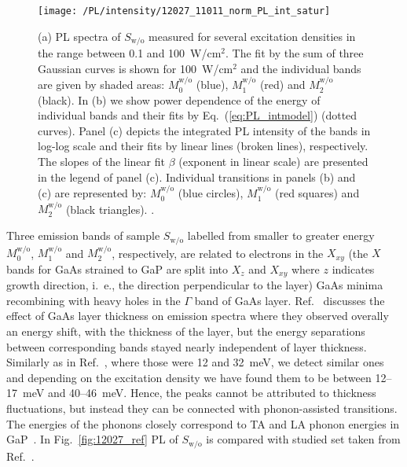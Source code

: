 \begin{figure}
	\centering
	\texttt{[image: /PL/intensity/12027\_11011\_norm\_PL\_int\_satur]}
	\caption{(a) PL spectra of $S_\mathrm{w/o}$ measured for several excitation densities in the range between 0.1 and 100~W/cm$^2$. The fit by the sum of three Gaussian curves is shown for 100~W/cm$^2$ and the individual bands are given by shaded areas: $M_0^\mathrm{w/o}$ (blue), $M_1^\mathrm{w/o}$ (red) and $M_2^\mathrm{w/o}$ (black). In (b) we show power dependence of the energy of individual bands and their fits by Eq.~(\ref{eq:PL_intmodel}) (dotted curves). Panel (c) depicts the integrated PL intensity of the bands in log-log scale and their fits by linear lines (broken lines), respectively. The slopes of the linear fit $\beta$ (exponent in linear scale) are presented in the legend of panel (c). Individual transitions in panels (b) and (c) are represented by: $M_0^\mathrm{w/o}$ (blue circles), $M_1^\mathrm{w/o}$ (red squares) and $M_2^\mathrm{w/o}$ (black triangles). {}.}
	\label{fig:QD_wo_int}
\end{figure}
%
Three emission bands of sample $S_\mathrm{w/o}$ labelled from smaller to greater energy $M_0^\mathrm{w/o}$, $M_1^\mathrm{w/o}$ and $M_2^\mathrm{w/o}$, respectively, are related to electrons in the $X_{xy}$ (the $X$ bands for GaAs strained to GaP are split into $X_z$ and $X_{xy}$ where $z$ indicates growth direction, i.~e., the direction perpendicular to the layer) GaAs minima recombining with heavy holes in the $\Gamma$ band of GaAs layer. Ref.~\citep{Prieto_APL1997} discusses the effect of GaAs layer thickness on emission spectra where they observed overally an energy shift, with the thickness of the layer, but the energy separations between corresponding bands stayed nearly independent of layer thickness. Similarly as in Ref.~\citep{Prieto_APL1997}, where those were 12 and 32~meV, we detect similar ones and depending on the excitation density we have found them to be between 12--17~meV and 40--46~meV. Hence, the peaks cannot be attributed to thickness fluctuations, but instead they can be connected with phonon-assisted transitions. The energies of the phonons closely correspond to TA and LA phonon energies in GaP~\citep{Prieto_APL1997}. In Fig.~\ref{fig:12027_ref} PL of $S_\mathrm{w/o}$ is compared with studied set taken from Ref.~\citep{Prieto_APL1997}.



